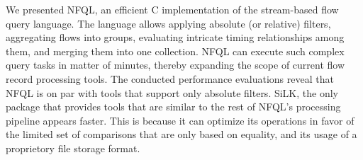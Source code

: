 We presented \ac{NFQL}, an efficient C implementation of the stream-based flow
query language. The language allows applying absolute (or relative) filters,
aggregating flows into groups, evaluating intricate timing relationships among
them, and merging them into one collection. \ac{NFQL} can execute such complex
query tasks in matter of minutes, thereby expanding the scope of current flow
record processing tools. The conducted performance evaluations reveal that
\ac{NFQL} is on par with tools that support only absolute filters. SiLK, the
only package that provides tools that are similar to the rest of \ac{NFQL}'s
processing pipeline appears faster. This is because it can optimize its
operations in favor of the limited set of comparisons that are only based on
equality, and its usage of a proprietory file storage format.
